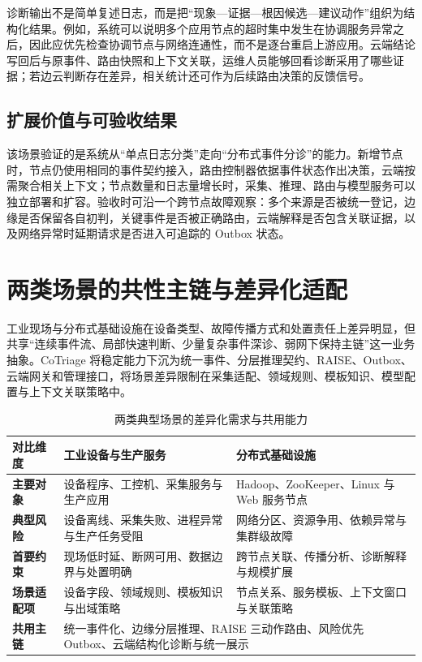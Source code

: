 诊断输出不是简单复述日志，而是把“现象—证据—根因候选—建议动作”组织为结构化结果。例如，系统可以说明多个应用节点的超时集中发生在协调服务异常之后，因此应优先检查协调节点与网络连通性，而不是逐台重启上游应用。云端结论写回后与原事件、路由快照和上下文关联，运维人员能够回看诊断采用了哪些证据；若边云判断存在差异，相关统计还可作为后续路由决策的反馈信号。

\subsection{扩展价值与可验收结果}

该场景验证的是系统从“单点日志分类”走向“分布式事件分诊”的能力。新增节点时，节点仍使用相同的事件契约接入，路由控制器依据事件状态作出决策，云端按需聚合相关上下文；节点数量和日志量增长时，采集、推理、路由与模型服务可以独立部署和扩容。验收时可沿一个跨节点故障观察：多个来源是否被统一登记，边缘是否保留各自初判，关键事件是否被正确路由，云端解释是否包含关联证据，以及网络异常时延期请求是否进入可追踪的 Outbox 状态。

\section{两类场景的共性主链与差异化适配}

工业现场与分布式基础设施在设备类型、故障传播方式和处置责任上差异明显，但共享“连续事件流、局部快速判断、少量复杂事件深诊、弱网下保持主链”这一业务抽象。CoTriage 将稳定能力下沉为统一事件、分层推理契约、RAISE、Outbox、云端网关和管理接口，将场景差异限制在采集适配、领域规则、模板知识、模型配置与上下文关联策略中。

\begin{table}[htbp]
  \centering
  \small
  \caption{两类典型场景的差异化需求与共用能力}
  \label{tab:scenario-comparison}
  \begin{tabularx}{\textwidth}{>{\bfseries}p{} X X}
    \toprule
    对比维度 & 工业设备与生产服务 & 分布式基础设施 \\
    \midrule
    主要对象 & 设备程序、工控机、采集服务与生产应用 & Hadoop、ZooKeeper、Linux 与 Web 服务节点 \\
    典型风险 & 设备离线、采集失败、进程异常与生产任务受阻 & 网络分区、资源争用、依赖异常与集群级故障 \\
    首要约束 & 现场低时延、断网可用、数据边界与处置明确 & 跨节点关联、传播分析、诊断解释与规模扩展 \\
    场景适配项 & 设备字段、领域规则、模板知识与出域策略 & 节点关系、服务模板、上下文窗口与关联策略 \\
    共用主链 & \multicolumn{2}{p{0.75\textwidth}}{统一事件化、边缘分层推理、RAISE 三动作路由、风险优先 Outbox、云端结构化诊断与统一展示} \\
    \bottomrule
  \end{tabularx}
\end{table}

